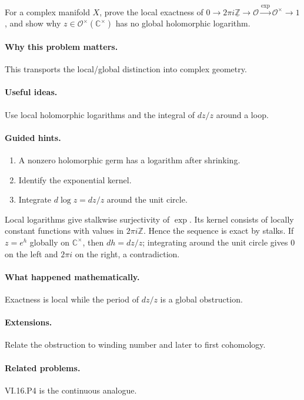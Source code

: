 \begin{problem}\label{prob:vi16-p05}
For a complex manifold $X$, prove the local exactness of $0\to2\pi i\underline{\mathbb Z}\to\mathcal O\xrightarrow{\exp}\mathcal O^\times\to1$, and show why $z\in\mathcal O^\times(\mathbb C^\times)$ has no global holomorphic logarithm.
\end{problem}

\ifdefined\FullProblemDossiers
\paragraph{Why this problem matters.}
This transports the local/global distinction into complex geometry.

\paragraph{Useful ideas.}
Use local holomorphic logarithms and the integral of $dz/z$ around a loop.

\paragraph{Guided hints.}
\begin{enumerate}
\item A nonzero holomorphic germ has a logarithm after shrinking.
\item Identify the exponential kernel.
\item Integrate $d\log z=dz/z$ around the unit circle.
\end{enumerate}

\begin{solution}
Local logarithms give stalkwise surjectivity of $\exp$.  Its kernel consists of locally constant functions with values in $2\pi i\mathbb Z$.  Hence the sequence is exact by stalks.  If $z=e^h$ globally on $\mathbb C^\times$, then $dh=dz/z$; integrating around the unit circle gives $0$ on the left and $2\pi i$ on the right, a contradiction.
\end{solution}

\paragraph{What happened mathematically.}
Exactness is local while the period of $dz/z$ is a global obstruction.

\paragraph{Extensions.}
Relate the obstruction to winding number and later to first cohomology.

\paragraph{Related problems.}
VI.16.P4 is the continuous analogue.
\fi

